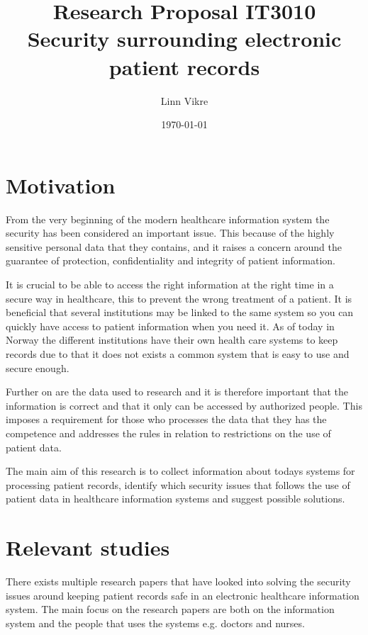\documentclass[11pt, a4paper]{article}
\title{Research Proposal IT3010\\ Security surrounding electronic patient records}
\author{Linn Vikre}
\date{\today}
\begin{document}
\maketitle
\section{Motivation}
From the very beginning of the modern healthcare information system the security has been considered an important issue. This because of the highly sensitive personal data\cite{personopplysningsloven201104} that they contains, and it raises a concern around the guarantee of protection, confidentiality and integrity of patient information\cite{Smith199939}. 

It is crucial to be able to access the right information at the right time in a secure way in healthcare, this to prevent the wrong treatment of a patient\cite{Barber199819}. It is beneficial that several institutions may be linked to the same system so you can quickly have access to patient information when you need it. As of today in Norway the different institutions have their own health care systems to keep records due to that it does not exists a common system that is easy to use and secure enough. 

Further on are the data used to research and it is therefore important that the information is correct and that it only can be accessed by authorized people. This imposes a requirement for those who processes the data that they has the competence and addresses the rules in relation to restrictions on the use of patient data\cite{faxvaag2007er}.

The main aim of this research is to collect information about todays systems for processing patient records, identify which security issues that follows the use of patient data in healthcare information systems and suggest possible solutions.

\section{Relevant studies}

There exists multiple research papers that have looked into solving the security issues around keeping patient records safe in an electronic healthcare information system. The main focus on the research papers are both on the information system and the people that uses the systems e.g. doctors and nurses.
\end{document}
